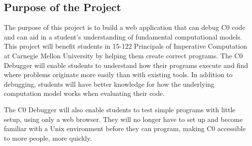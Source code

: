 \documentclass[11pt]{article}
\begin{document}
\subsection{Purpose of the Project}
The purpose of this project is to build a web application that can debug C0
code and can aid in a student's understanding of fundamental computational
models. This project will benefit students in 15-122 Principals of Imperative
Computation at Carnegie Mellon University by helping them create correct
programs. The C0 Debugger will enable students to understand how their programs
execute and find where problems originate more easily than with existing tools.
In addition to debugging, students will have better knowledge for how the
underlying computation model works when evaluating their code.
\par
The C0 Debugger will also enable students to test simple programs with little
setup, using only a web browser. They will no longer have to set up and become
familiar with a Unix environment before they can program, making C0 accessible
to more people, more quickly.
\end{document}

